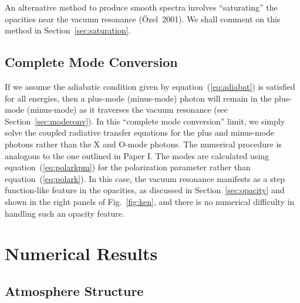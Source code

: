 \documentclass{mn2e}
\newcommand{\holai}{Paper I}
\begin{document}
{An alternative method to produce smooth spectra involves
``saturating'' the opacities near the vacuum resonance (\"{O}zel~2001).
We shall comment on this method in Section~\ref{sec:saturation}.

\subsection{Complete Mode Conversion} \label{sec:numcompmc}

If we assume the adiabatic condition given by equation~(\ref{eq:adiabat})
is satisfied for all energies, then a plus-mode (minus-mode) photon
will remain in the plus-mode (minus-mode) as it traverses the
vacuum resonance (see Section~\ref{sec:modeconv}).
In this ``complete mode conversion'' limit, we simply solve
the coupled radiative transfer equations for the plus and minus-mode
photons rather than the X and O-mode photons.  The numerical
procedure is analogous to the one outlined in \holai.
The modes are calculated using equation~(\ref{eq:polarkpm}) for
the polarization parameter rather than equation~(\ref{eq:polark}).
In this case, the vacuum resonance manifests as a step function-like
feature in the opacities, as discussed in Section~\ref{sec:opacity}
and shown in the right panels of Fig.~\ref{fig:ken}, and there is
no numerical difficulty in handling such an opacity feature.

\setcounter{equation}{0}
\section{Numerical Results} \label{sec:results}

\subsection{Atmosphere Structure} \label{sec:atmstructure}

}
\end{document}
